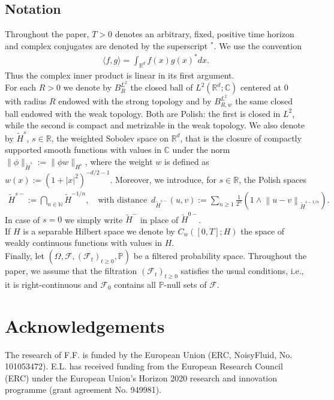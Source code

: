 \documentclass[a4paper,10pt]{amsart}
\newcommand{\C}{\mathbb{C}}
\newcommand{\N}{\mathbb{N}}
\newcommand{\R}{\mathbb{R}}
\newcommand{\norm}[1]{\left\|#1\right\|}
\theoremstyle{remark}
\numberwithin{equation}{section}
\newenvironment{acknowledgements}{%
  \section*{Acknowledgements}
}{}
\begin{document}
\subsection*{Notation}
Throughout the paper, $T > 0$ denotes an arbitrary, fixed, positive time horizon and complex conjugates are denoted by the superscript $^*$. We use the convention
\begin{align*}
    \langle f,g\rangle=\int_{\R^d}f(x)g(x)^* dx.
\end{align*}
Thus the complex inner product is linear in its first argument.\\
For each $R>0$ we denote by $B^{L^2}_R$ the closed ball of $L^2(\R^d;\C)$ centered at $0$ with radius $R$ endowed with the strong topology and by $B^{L^2}_{R,w}$ the same closed ball endowed with the weak topology. Both are Polish: the first is closed in $L^2$, while the second is compact and metrizable in the weak topology.
We also denote by $\tilde{H}^s$, $s \in \R$, the weighted Sobolev space on $\R^d$, that is the closure of compactly supported smooth functions with values in $\C$ under the norm $\| \phi \|_{\tilde{H}^s} := \| \phi w \|_{H^s}$, where the weight $w$ is defined as $w(x) := (1+|x|^2)^{-d/2-1}$. 
Moreover, we introduce, for $s\in \R$, the Polish spaces
\begin{align*}
\tilde{H}^{s-} := \bigcap_{n \in \N} \tilde{H}^{-1/n},
\quad
\mbox{with distance }\,
d_{\tilde{H}^{s-}}(u,v):=\sum_{n\geq 1}\frac{1}{2^n}\left(1\wedge \norm{u-v}_{\tilde{H}^{s-1/n}}\right).
\end{align*}
In case of $s=0$ we simply write $\tilde{H}^{-}$ in place of $\tilde{H}^{0-}$.\\
If $H$ is a separable Hilbert space we denote by $C_w([0,T];H)$ the space of weakly continuous functions with values in $H.$ \\ Finally, let $(\Omega,\mathcal{F},(\mathcal{F}_t)_{t\ge0},\mathbb{P})$ be a filtered probability space. Throughout the paper, we assume that the filtration $(\mathcal{F}_t)_{t\ge0}$ satisfies the usual conditions, i.e., it is right-continuous and $\mathcal{F}_0$ contains all $\mathbb{P}$-null sets of $\mathcal{F}$. 
\begin{acknowledgements}
The research of F.F. is funded by the European Union (ERC, NoisyFluid, No. 101053472). E.L. has received funding from the European Research Council (ERC) under the European Union’s Horizon 2020 research and innovation programme (grant agreement No. 949981).
\end{acknowledgements}
\end{document}
